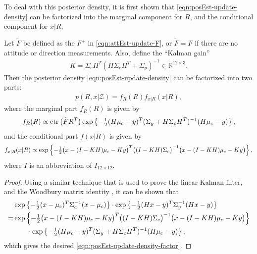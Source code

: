 To deal with this posterior density, it is first shown that \eqref{eqn:posEst-update-density} can be factorized into the marginal component for $R$, and the conditional component for $x|R$.
\begin{lemma} \label{lemma:posEst-update-factor}
	Let $\tilde{F}$ be defined as the $F^+$ in \eqref{eqn:attEst-update-F}, or $\tilde{F} = F$ if there are no attitude or direction measurements.
	Also, define the ``Kalman gain''
	\begin{align}
		K = \Sigma_cH^T(H\Sigma_cH^T + \Sigma_y)^{-1} \in \mathbb{R}^{12\times 3}.
	\end{align}
	Then the posterior density \eqref{eqn:posEst-update-density} can be factorized into two parts:
	\begin{align} \label{eqn:posEst-update-density-factor}
		p(R,x|\mathcal{Z}) = f_R(R) f_{x|R}(x|R),
	\end{align}
	where the marginal part $f_R(R)$ is given by
	\begin{align} \label{eqn:posEst-update-density-R}
		f_R(R) \propto \mathrm{etr}\left( \tilde{F}R^T \right) \exp\left\{ -\tfrac{1}{2}(H\mu_c-y)^T (\Sigma_y+H\Sigma_cH^T)^{-1} (H\mu_c-y) \right\},
	\end{align}
	and the conditional part $f(x|R)$ is given by
	\begin{align} \label{eqn:posEst-update-density-x|R}
		f_{x|R}(x|R) \propto \exp\left\{ -\tfrac{1}{2} \big(x-(I-KH)\mu_c-Ky\big)^T \big((I-KH)\Sigma_c\big)^{-1} \big(x-(I-KH)\mu_c-Ky\big) \right\},
	\end{align}
	where $I$ is an abbreviation of $I_{12\times 12}$.
\end{lemma}
\begin{proof}
	Using a similar technique that is used to prove the linear Kalman filter, and the Woodbury matrix identity \cite{petersen2008matrix}, it can be shown that
	\begin{align*}
		&\exp\left\{ -\tfrac{1}{2}(x-\mu_c)^T\Sigma_c^{-1}(x-\mu_c) \right\} \cdot \exp\left\{ -\tfrac{1}{2}(Hx-y)^T\Sigma_y^{-1}(Hx-y) \right\} \\
		= &\exp\left\{ -\tfrac{1}{2} \big(x-(I-KH)\mu_c-Ky\big)^T \big((I-KH)\Sigma_c\big)^{-1} \big(x-(I-KH)\mu_c-Ky\big) \right\} \\
		&\qquad \cdot \exp\left\{ -\tfrac{1}{2}(H\mu_c-y)^T (\Sigma_y+H\Sigma_cH^T)^{-1} (H\mu_c-y) \right\},
	\end{align*}
	which gives the desired \eqref{eqn:posEst-update-density-factor}.
\end{proof}


